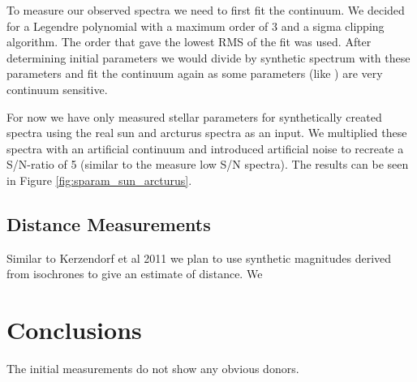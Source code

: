 To measure our observed spectra we need to first fit the continuum. We decided for a Legendre polynomial with a maximum order of 3 and a sigma clipping algorithm. The order that gave the lowest RMS of the fit was used. After determining initial parameters we would divide by synthetic spectrum with these parameters and fit the continuum again as some parameters (like \feh) are very continuum sensitive.  

For now we have only measured stellar parameters for synthetically created spectra using the real sun and arcturus spectra as an input. We multiplied these spectra with an artificial continuum and introduced artificial noise to recreate a S/N-ratio of 5 (similar to the measure low S/N spectra). The results can be seen in Figure \ref{fig:sparam_sun_arcturus}.


\subsection{Distance Measurements}

Similar to Kerzendorf et al 2011 we plan to use synthetic magnitudes derived from isochrones to give an estimate of distance. 
We 

\section{Conclusions}

The initial measurements do not show any obvious donors. 

